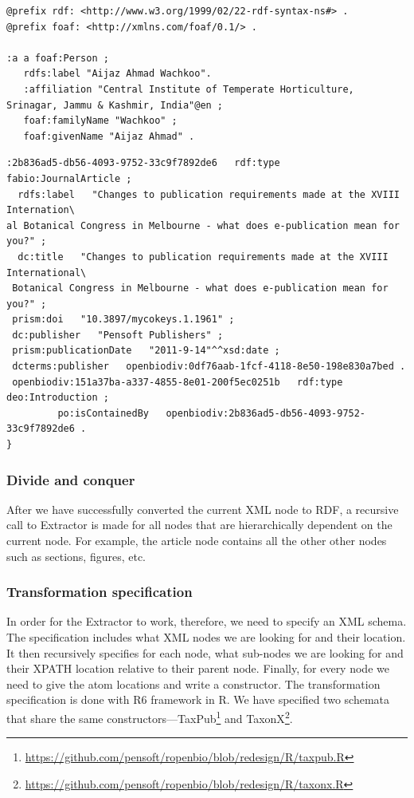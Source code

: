 \begin{lstlisting}[language=SPARQL,
caption=RDF snippet of an author. This is a somewhat idealized situation in which the language of the address was available from the article., label=listing:author_rdf, basicstyle=\ttfamily\tiny]
@prefix rdf: <http://www.w3.org/1999/02/22-rdf-syntax-ns#> .
@prefix foaf: <http://xmlns.com/foaf/0.1/> .

:a a foaf:Person ;
   rdfs:label "Aijaz Ahmad Wachkoo".
   :affiliation "Central Institute of Temperate Horticulture, Srinagar, Jammu & Kashmir, India"@en ;
   foaf:familyName "Wachkoo" ;
   foaf:givenName "Aijaz Ahmad" .
\end{lstlisting}

\begin{lstlisting}[language=SPARQL,
caption=., label=listing:parent-node-rdf, basicstyle=\ttfamily\tiny]
:2b836ad5-db56-4093-9752-33c9f7892de6   rdf:type   fabio:JournalArticle ;
  rdfs:label   "Changes to publication requirements made at the XVIII Internation\
al Botanical Congress in Melbourne - what does e-publication mean for you?" ;
  dc:title   "Changes to publication requirements made at the XVIII International\
 Botanical Congress in Melbourne - what does e-publication mean for you?" ;
 prism:doi   "10.3897/mycokeys.1.1961" ;
 dc:publisher   "Pensoft Publishers" ;
 prism:publicationDate   "2011-9-14"^^xsd:date ;
 dcterms:publisher   openbiodiv:0df76aab-1fcf-4118-8e50-198e830a7bed .
 openbiodiv:151a37ba-a337-4855-8e01-200f5ec0251b   rdf:type   deo:Introduction ;
         po:isContainedBy   openbiodiv:2b836ad5-db56-4093-9752-33c9f7892de6 .
}
\end{lstlisting}

\subsubsection{Divide and conquer}

After we have successfully converted the current XML node to RDF, a recursive call to Extractor is made for all nodes that are hierarchically dependent on the current node. For example, the article node contains all the other other nodes such as sections, figures, etc.

\subsubsection{Transformation specification}

In order for the Extractor to work, therefore, we need to specify an XML schema. The specification includes what XML nodes we are looking for and their location. It then recursively specifies for each node, what sub-nodes we are looking for and their XPATH location relative to their parent node. Finally, for every node we need to give the atom locations and write a constructor. The transformation specification is done with R6 framework in R. We have specified two schemata that share the same constructors---TaxPub\footnote{\url{https://github.com/pensoft/ropenbio/blob/redesign/R/taxpub.R}} and TaxonX\footnote{\url{https://github.com/pensoft/ropenbio/blob/redesign/R/taxonx.R}}.

